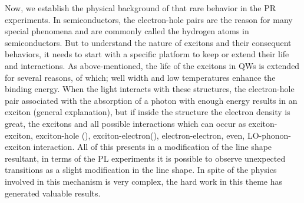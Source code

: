 Now, we establish the physical background of that rare behavior in the PR experiments. In semiconductors, the electron-hole pairs are the reason for many special phenomena and are commonly called the hydrogen atoms in semiconductors. But to understand the nature of excitons and their consequent behaviors, it needs to start with a specific platform to keep or extend their life and interactions.  As above-mentioned, the life of the excitons in QWs is extended for several reasons, of which; well width and low temperatures enhance the binding energy\cite{bastard1982exciton,shinozuka1983wannier}. When the light interacts with these structures, the electron-hole pair associated with the absorption of a photon with enough energy results in an exciton (general explanation), but if inside the structure the electron density is great\cite{kheng1993observation}, the excitons and all possible interactions which can occur as exciton-exciton, exciton-hole (\xm), exciton-electron(\xp), electron-electron, even, LO-phonon-exciton interaction. 
All of this presents in a modification of the line shape resultant, in terms of the PL experiments it is possible to observe unexpected transitions as a slight modification in the line shape. In spite of the physics involved in this mechanism is very complex, the hard work in this theme has generated valuable results. 

